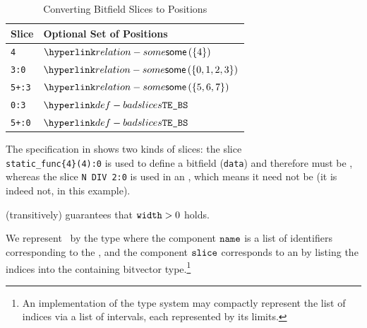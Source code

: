 \begin{table}[h]
\caption{Converting Bitfield Slices to Positions\label{ta:bitfieldslicetopositions}}
\begin{center}
\begin{tabular}{ll}
  \textbf{Slice} & \textbf{Optional Set of Positions}\\
  \hline
  \verb|4|    & $\some{\{4\}}$ \\
  \verb|3:0|  & $\some{\{0, 1, 2, 3\}}$\\
  \verb|5+:3| & $\some{\{5, 6, 7\}}$\\
  \hline
  \verb|0:3|  & $\BadSlices$\\
  \verb|5+:0| & $\BadSlices$\\
\end{tabular}
\end{center}
\end{table}





The specification in  shows two kinds of slices:
the slice \\
\verb|static_func{4}(4):0| is used to define a bitfield (\verb|data|)
and therefore must be \staticallyevaluableterm,
whereas the slice \verb|N DIV 2:0| is used in an \assignableexpression, which means
it need not be \staticallyevaluableterm{} (it is indeed not, in this example).




 (transitively) guarantees that $\texttt{width} > 0$ holds.

We represent \absolutebitfields\ by the type
where the component $\texttt{name}$ is a list of identifiers corresponding to the \absolutename,
and the component $\texttt{slice}$ corresponds to an \absoluteslice{} by listing the indices
into the containing bitvector type.\footnote{An implementation of the type system may compactly represent the list of indices
via a list of intervals, each represented by its limits.}

